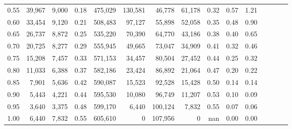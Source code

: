 \begin{tabular}{rrrcrrrrrrrrrrr}
0.55 &  39,967 &  9,000 &                                       0.18 &  475,029 &  130,581 &   46,778 &   61,178 &  0.32 &  0.57 &                         1.21 \\
0.60 &  33,454 &  9,120 &                                       0.21 &  508,483 &   97,127 &   55,898 &   52,058 &  0.35 &  0.48 &                         0.90 \\
0.65 &  26,737 &  8,872 &                                       0.25 &  535,220 &   70,390 &   64,770 &   43,186 &  0.38 &  0.40 &                         0.65 \\
0.70 &  20,725 &  8,277 &                                       0.29 &  555,945 &   49,665 &   73,047 &   34,909 &  0.41 &  0.32 &                         0.46 \\
0.75 &  15,208 &  7,457 &                                       0.33 &  571,153 &   34,457 &   80,504 &   27,452 &  0.44 &  0.25 &                         0.32 \\
0.80 &  11,033 &  6,388 &                                       0.37 &  582,186 &   23,424 &   86,892 &   21,064 &  0.47 &  0.20 &                         0.22 \\
0.85 &   7,901 &  5,636 &                                       0.42 &  590,087 &   15,523 &   92,528 &   15,428 &  0.50 &  0.14 &                         0.14 \\
0.90 &   5,443 &  4,221 &                                       0.44 &  595,530 &   10,080 &   96,749 &   11,207 &  0.53 &  0.10 &                         0.09 \\
0.95 &   3,640 &  3,375 &                                       0.48 &  599,170 &    6,440 &  100,124 &    7,832 &  0.55 &  0.07 &                         0.06 \\
1.00 &   6,440 &  7,832 &                                       0.55 &  605,610 &        0 &  107,956 &        0 &   nan &  0.00 &                         0.00 \\
\bottomrule
\end{tabular}
